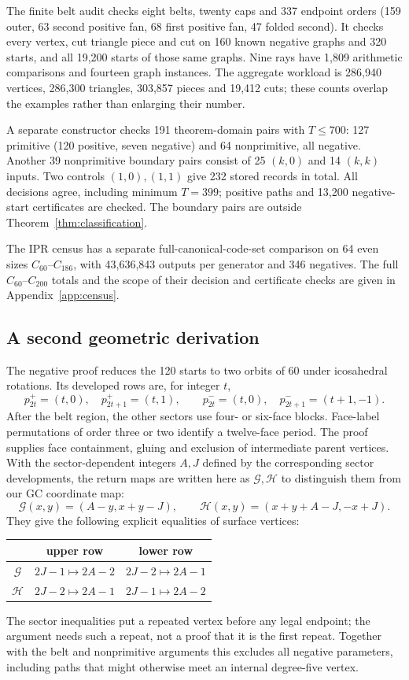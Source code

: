 \documentclass[11pt]{amsart}
\begin{document}
The finite belt audit checks eight belts, twenty caps and 337 endpoint
orders (159 outer, 63 second positive fan, 68 first positive fan,
47 folded second). It checks every vertex, cut triangle piece and cut
on 160 known negative graphs and 320 starts, and all 19,200 starts
of those same graphs. Nine rays have 1,809 arithmetic comparisons and
fourteen graph instances. The aggregate workload is 286,940 vertices,
286,300 triangles, 303,857 pieces and 19,412 cuts; these counts overlap
the examples rather than enlarging their number.

A separate constructor checks 191 theorem-domain pairs with $T\le700$:
127 primitive (120 positive, seven negative) and 64 nonprimitive,
all negative. Another 39 nonprimitive boundary pairs consist of
25 $(k,0)$ and 14 $(k,k)$ inputs. Two controls $(1,0),(1,1)$ give
232 stored records in total. All decisions agree, including minimum
$T=399$; positive paths and 13,200 negative-start certificates are
checked. The boundary pairs are outside Theorem~\ref{thm:classification}.

The IPR census has a separate full-canonical-code-set comparison on
64 even sizes $C_{60}$--$C_{186}$, with 43,636,843 outputs per generator
and 346 negatives. The full $C_{60}$--$C_{200}$ totals and the scope of
their decision and certificate checks are given in Appendix~\ref{app:census}.

\subsection{A second geometric derivation}
The negative proof reduces the 120 starts to two orbits of 60 under
icosahedral rotations. Its developed rows are, for integer $t$,
\[
 p^+_{2t}=(t,0),\quad p^+_{2t+1}=(t,1),\qquad
 p^-_{2t}=(t,0),\quad p^-_{2t+1}=(t+1,-1).
\]
After the belt region, the other sectors use four- or six-face blocks.
Face-label permutations of order three or two identify a twelve-face
period. The proof supplies face containment, gluing and exclusion of
intermediate parent vertices. With the sector-dependent integers $A,J$
defined by the corresponding sector developments, the return maps
are written here as $\mathcal G,\mathcal H$ to distinguish them from
our GC coordinate map:
\[
 \mathcal G(x,y)=(A-y,x+y-J),\qquad
 \mathcal H(x,y)=(x+y+A-J,-x+J).
\]
They give the following explicit equalities of surface vertices:
\begin{center}
\begin{tabular}{c|cc}
 & upper row & lower row\\\hline
$\mathcal G$ & $2J-1\mapsto2A-2$ & $2J-2\mapsto2A-1$\\
$\mathcal H$ & $2J-2\mapsto2A-1$ & $2J-1\mapsto2A-2$
\end{tabular}
\end{center}
The sector inequalities put a repeated vertex before any legal endpoint;
the argument needs such a repeat, not a proof that it is the first repeat.
Together with the belt and nonprimitive arguments this excludes all
negative parameters, including paths that might otherwise meet an
internal degree-five vertex.
\end{document}
